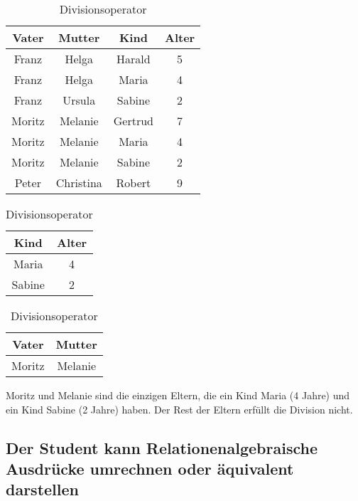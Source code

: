 \begin{table}[!htp]
	\centering
	\begin{subtable}[b]{0.3\textwidth}
		\centering
		\begin{tabular}{|c|c|c|c|}
			\hline
			Vater & Mutter & Kind & Alter \\
			\hline
			Franz & Helga & Harald & 5 \\
			\hline
			Franz & Helga & Maria & 4 \\
			\hline
			Franz & Ursula & Sabine & 2 \\
			\hline
			Moritz & Melanie & Gertrud & 7 \\
			\hline
			\rowcolor{green} Moritz & Melanie & Maria & 4 \\
			\hline
			\rowcolor{green} Moritz & Melanie & Sabine & 2 \\
			\hline
			Peter & Christina & Robert & 9 \\
			\hline
		\end{tabular}
	\end{subtable}
	\begin{subtable}[b]{0.3\textwidth}
		\centering
		\begin{tabular}{|c|c|}
			\hline
			Kind & Alter \\
			\hline
			Maria & 4 \\
			\hline 
			Sabine & 2 \\
			\hline
		\end{tabular}
	\end{subtable}
	\begin{subtable}[b]{0.3\textwidth}
		\centering
		\begin{tabular}{|c|c|}
			\hline
			Vater & Mutter \\
			\hline
			Moritz & Melanie \\
			\hline
		\end{tabular}
	\end{subtable}
	\caption{Divisionsoperator}
\end{table}

Moritz und Melanie sind die einzigen Eltern, die ein Kind Maria (4 Jahre) und ein Kind Sabine (2 Jahre) haben. Der Rest der Eltern erfüllt die Division nicht.

\subsection{Der Student kann Relationenalgebraische Ausdrücke umrechnen oder äquivalent darstellen}

